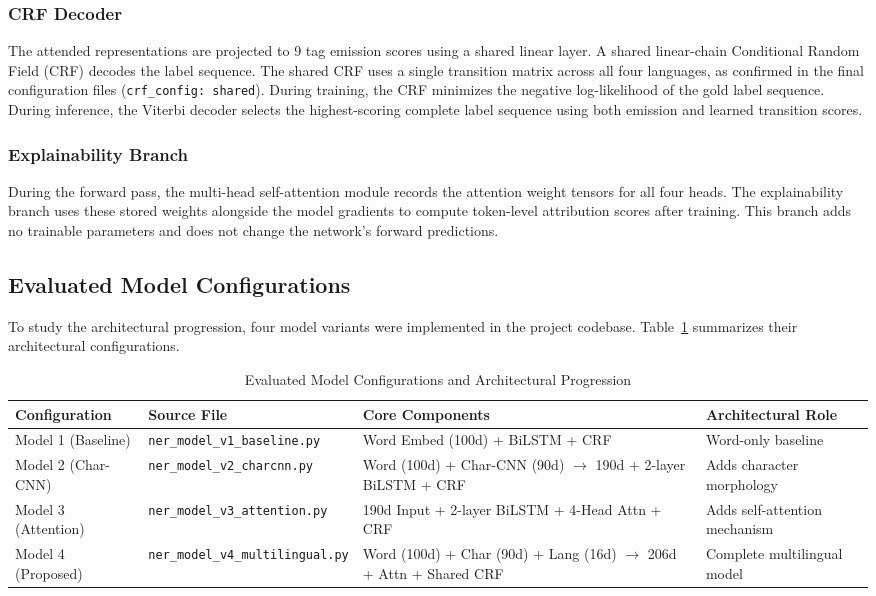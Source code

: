 \documentclass[pdflatex,sn-mathphys-num]{sn-jnl}
\begin{document}
\subsubsection{CRF Decoder}\label{subsubsec:crf}

The attended representations are projected to 9 tag emission scores using a shared linear layer. A shared linear-chain Conditional Random Field (CRF) decodes the label sequence. The shared CRF uses a single transition matrix across all four languages, as confirmed in the final configuration files (\texttt{crf\_config: shared}). During training, the CRF minimizes the negative log-likelihood of the gold label sequence. During inference, the Viterbi decoder selects the highest-scoring complete label sequence using both emission and learned transition scores.

\subsubsection{Explainability Branch}\label{subsubsec:explain_branch}

During the forward pass, the multi-head self-attention module records the attention weight tensors for all four heads. The explainability branch uses these stored weights alongside the model gradients to compute token-level attribution scores after training. This branch adds no trainable parameters and does not change the network's forward predictions.

\subsection{Evaluated Model Configurations}\label{subsec:model_configs}

To study the architectural progression, four model variants were implemented in the project codebase. Table~\ref{tab:models} summarizes their architectural configurations.

\begin{table}[htbp]
\centering
\caption{Evaluated Model Configurations and Architectural Progression}
\label{tab:models}
\small
\begin{tabular}{llll}
\toprule
\textbf{Configuration} & \textbf{Source File} & \textbf{Core Components} & \textbf{Architectural Role} \\
\midrule
Model 1 (Baseline) & \texttt{ner\_model\_v1\_baseline.py} & Word Embed (100d) + BiLSTM + CRF & Word-only baseline \\
Model 2 (Char-CNN) & \texttt{ner\_model\_v2\_charcnn.py}  & Word (100d) + Char-CNN (90d) $\to$ 190d + 2-layer BiLSTM + CRF & Adds character morphology \\
Model 3 (Attention)& \texttt{ner\_model\_v3\_attention.py}& 190d Input + 2-layer BiLSTM + 4-Head Attn + CRF & Adds self-attention mechanism \\
Model 4 (Proposed) & \texttt{ner\_model\_v4\_multilingual.py}& Word (100d) + Char (90d) + Lang (16d) $\to$ 206d + Attn + Shared CRF & Complete multilingual model \\
\bottomrule
\end{tabular}
\end{table}
\end{document}
